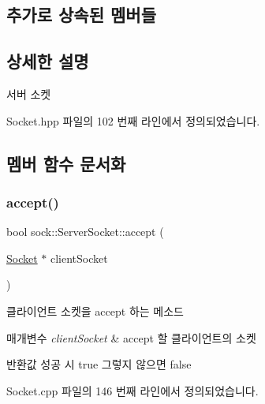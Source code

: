 \subsection*{추가로 상속된 멤버들}


\subsection{상세한 설명}
서버 소켓 

Socket.\+hpp 파일의 102 번째 라인에서 정의되었습니다.



\subsection{멤버 함수 문서화}
\mbox{\label{classsock_1_1_server_socket_add433570d6d808d667e2f2b5c24a5dd1}} 
\subsubsection{\texorpdfstring{accept()}{accept()}}
{\footnotesize\ttfamily bool sock\+::\+Server\+Socket\+::accept (\begin{DoxyParamCaption}\item[{\hyperlink{classsock_1_1_socket}{Socket} $\ast$}]{client\+Socket }\end{DoxyParamCaption})}



클라이언트 소켓을 accept 하는 메소드 


\begin{DoxyParams}{매개변수}
{\em client\+Socket} & accept 할 클라이언트의 소켓 \\
\hline
\end{DoxyParams}
\begin{DoxyReturn}{반환값}
성공 시 true 그렇지 않으면 false 
\end{DoxyReturn}


Socket.\+cpp 파일의 146 번째 라인에서 정의되었습니다.

\mbox{\label{classsock_1_1_server_socket_a70e23f56e41228cbf43afe7702519f45}} 

